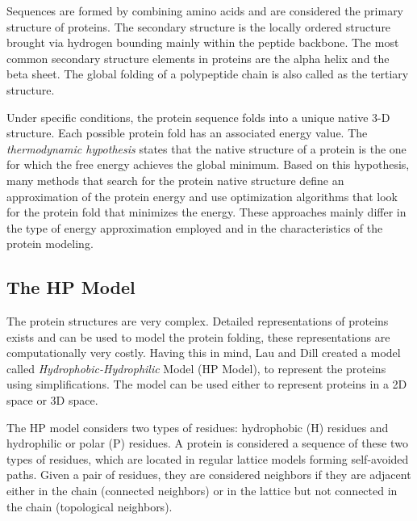 \documentclass[conference]{IEEEtran}
\begin{document}
Sequences are formed by combining amino acids and are considered the primary structure of
proteins.
The secondary structure is the locally ordered structure brought via hydrogen bounding mainly within the peptide backbone. The most common secondary structure elements in proteins are the alpha helix and the beta sheet. The global folding of a polypeptide chain is also called as the tertiary structure.


Under specific conditions, the protein sequence folds into a unique native 3-D structure. Each possible protein fold has an associated energy value. The \emph{thermodynamic hypothesis} states that the native structure of a protein is the one for which the free energy achieves the global minimum. Based on this hypothesis, many methods \cite{custodio2004investigation, hsu2003growth, krasnogor2002multimeme, lin2011protein, unger1993genetic} that search for the protein native structure define an approximation of the protein energy and use optimization algorithms that look for the protein fold that minimizes the energy. These approaches mainly differ in the type of energy approximation employed and in the characteristics of the protein modeling.


\subsection{The HP Model} \label{sec:hpModel}


The protein structures are very complex. Detailed representations of proteins exists and can be used to model the protein folding, these representations are computationally very costly. Having this in mind, Lau and Dill \cite{lau1989lattice} created a model called \textit{Hydrophobic-Hydrophilic} Model (HP Model), to represent the proteins using simplifications. The model can be used either to represent proteins in a 2D space or 3D space.


The HP model considers two types of residues:  hydrophobic (H) residues  and hydrophilic or polar (P) residues. A protein is considered a sequence of these two types of residues, which are located in regular lattice models forming self-avoided paths. Given a pair of residues, they are considered neighbors if they are adjacent  either in the chain (connected neighbors) or  in the lattice but not connected in the chain (topological neighbors).
\end{document}

